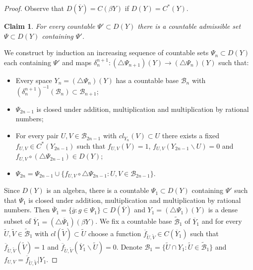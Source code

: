 \documentclass[12pt]{amsart}
\newtheorem{claim}{Claim}
\begin{document}
\begin{proof} Observe that $D(\overline Y)=C(\beta Y)$ if $D(Y)=C^*(Y)$.
\begin{claim}
For every countable $\Psi'\subset D(Y)$ there is a countable admissible set $\Psi\subset D(Y)$ containing $\Psi'$.
\end{claim}
We construct by induction an increasing sequence of countable sets $\Psi_n\subset D(Y)$ each containing $\Psi'$ and maps 
$\delta^{n+1}_n:(\triangle\Psi_{n+1})(Y)\to(\triangle\Psi_{n})(Y)$ such that: 
\begin{itemize}
\item Every space $Y_n=(\triangle\Psi_{n})(Y)$ has a countable base $\mathcal B_n$ with $(\delta^{n+1}_n)^{-1}(\mathcal B_n)\subset\mathcal B_{n+1}$;
\item $\Psi_{2n-1}$ is closed under addition, multiplication and multiplication by rational numbers;
\item For every pair $U,V\in\mathcal B_{2n-1}$ with $cl_{Y_n}(V)\subset U$ there exists a  fixed $f_{U,V}\in C^*(Y_{2n-1})$ such that 
$f_{U,V}(V)=1$, $f_{U,V}(Y_{2n-1}\backslash U)=0$ and $f_{U,V}\circ(\triangle\Psi_{2n-1})\in D(Y)$; 
\item $\Psi_{2n}=\Psi_{2n-1}\cup\{f_{U,V}\circ\triangle\Psi_{2n-1}:U,V\in\mathcal B_{2n-1}\}$.
\end{itemize} 
Since $D(Y)$ is an algebra, there is a countable $\Psi_1\subset D(Y)$ containing $\Psi'$ such that $\Psi_1$ is closed under addition, multiplication and multiplication by rational numbers. Then 
$\overline\Psi_1=\{\overline g:g\in\Psi_1\}\subset D(\overline Y)$ and $Y_1=(\triangle\Psi_{1})(Y)$ is a dense subset of 
$\overline Y_1=(\triangle\overline\Psi_{1})(\beta Y)$. We fix a countable base $\widetilde{\mathcal B}_1$ of $\overline Y_1$ and for every $\widetilde U,\widetilde V\in\widetilde{\mathcal B}_1$ with $cl(\widetilde V)\subset\widetilde U$ choose  
a function $\overline f_{\widetilde U,\widetilde V}\in C(\overline Y_1)$ such that  
$\overline f_{\widetilde U,\widetilde V}(\widetilde V)=1$ and $\overline f_{\widetilde U,\widetilde V}(\overline Y_1\backslash \widetilde U)=0$.
Denote $\mathcal B_1=\{\widetilde U\cap Y_1:\widetilde U\in\widetilde{\mathcal B}_1\}$ and $f_{U,V}=\overline f_{\widetilde U,\widetilde V}|Y_1$.


\end{proof}
\end{document}
